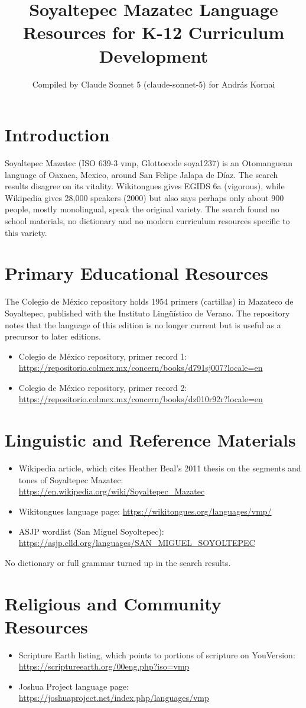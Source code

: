 \documentclass[12pt]{article}
\title{Soyaltepec Mazatec Language Resources for K-12 Curriculum Development}
\author{Compiled by Claude Sonnet 5 (claude-sonnet-5) for Andr\'as Kornai}
\date{}
\begin{document}
\maketitle
\section{Introduction}
Soyaltepec Mazatec (ISO 639-3 vmp, Glottocode soya1237) is an Otomanguean language of Oaxaca, Mexico, around San Felipe Jalapa de D\'iaz. The search results disagree on its vitality. Wikitongues gives EGIDS 6a (vigorous), while Wikipedia gives 28,000 speakers (2000) but also says perhaps only about 900 people, mostly monolingual, speak the original variety. The search found no school materials, no dictionary and no modern curriculum resources specific to this variety.
\section{Primary Educational Resources}
The Colegio de M\'exico repository holds 1954 primers (cartillas) in Mazateco de Soyaltepec, published with the Instituto Ling\"u\'istico de Verano. The repository notes that the language of this edition is no longer current but is useful as a precursor to later editions.
\begin{itemize}
\item Colegio de M\'exico repository, primer record 1: \url{https://repositorio.colmex.mx/concern/books/d791sj007?locale=en}
\item Colegio de M\'exico repository, primer record 2: \url{https://repositorio.colmex.mx/concern/books/dz010r92r?locale=en}
\end{itemize}
\section{Linguistic and Reference Materials}
\begin{itemize}
\item Wikipedia article, which cites Heather Beal's 2011 thesis on the segments and tones of Soyaltepec Mazatec: \url{https://en.wikipedia.org/wiki/Soyaltepec_Mazatec}
\item Wikitongues language page: \url{https://wikitongues.org/languages/vmp/}
\item ASJP wordlist (San Miguel Soyoltepec): \url{https://asjp.clld.org/languages/SAN_MIGUEL_SOYOLTEPEC}
\end{itemize}
No dictionary or full grammar turned up in the search results.
\section{Religious and Community Resources}
\begin{itemize}
\item Scripture Earth listing, which points to portions of scripture on YouVersion: \url{https://scriptureearth.org/00eng.php?iso=vmp}
\item Joshua Project language page: \url{https://joshuaproject.net/index.php/languages/vmp}
\end{itemize}
\end{document}
